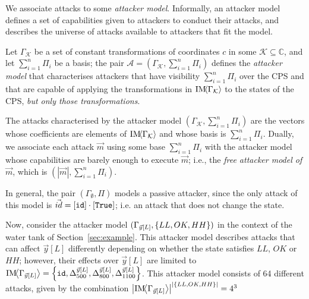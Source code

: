 {We associate attacks to some \emph{attacker model}.
Informally, an attacker model defines a set of capabilities given to attackers to conduct their attacks, and describes the universe of attacks available to attackers that fit the model. 
\begin{definition}
 Let $\Gamma_\mathcal{K}$ be a set of constant transformations of coordinates $c$ in some $\mathcal{K}\subseteq\mathbb{C}$, and let $\sum_{i=1}^n\Pi_i$ be a basis; the pair $\mathcal{A}=(\Gamma_{\mathcal{K}}, \sum_{i=1}^n\Pi_i)$ defines the \emph{attacker model} that characterises attackers that have visibility $\sum_{i=1}^n\Pi_i$ over the CPS and that are capable of applying the transformations in $\text{IM}\!{{\left<\Gamma_\mathcal{K}\right>}}$ %
  to the states of the CPS, \emph{but only those transformations}. %
  
  The attacks characterised by the attacker model $(\Gamma_{\mathcal{K}}, \sum_{i=1}^n\Pi_i)$ are the vectors whose coefficients are elements of $\text{IM}\!{{\left<\Gamma_\mathcal{K}\right>}}$ and whose basis is $\sum_{i=1}^n\Pi_i$. Dually, we associate each attack $\vec{m}$ using some base $\sum_{i=1}^n\Pi_i$ with the attacker model whose capabilities are barely enough to execute $\vec{m}$; i.e., the \emph{free attacker model of $\vec{m}$}, which is $(|\vec{m}|, \sum_{i=1}^n\Pi_i)$.
\end{definition}
\begin{example}
  In general, the pair $(\Gamma_{\emptyset}, \Pi)$ models a passive attacker, since the only attack of this model is $\vec{id}=[{\texttt{id}}]\cdot[\texttt{True}]$; i.e. an attack that does not change the state. %

  Now, consider the attacker model $(\Gamma_{\vec{y}[L]},\left\{LL,OK,HH\right\})$ in the context of the water tank of Section~\ref{sec:example}. This attacker model describes attacks that can affect $\vec{y}[L]$ differently depending on whether the state satisfies $LL$, $OK$ or $HH$; 
  however, their effects over $\vec{y}[L]$ are limited to $\text{IM}\!{{\left<\Gamma_{\vec{y}[L]}\right>}}=\left\{{\texttt{id}}, {\Delta}^{\vec{y}[L]}_{500}, {\Delta}^{\vec{y}[L]}_{800}, {\Delta}^{\vec{y}[L]}_{1100}\right\}$. This attacker model consists of 64 different attacks, given by the combination ${\left|\text{IM}\!{{\left<\Gamma_{\vec{y}[L]}\right>}}\right|}^{\left|\left\{LL,OK,HH\right\}\right|}=4^3$
\end{example}

}
